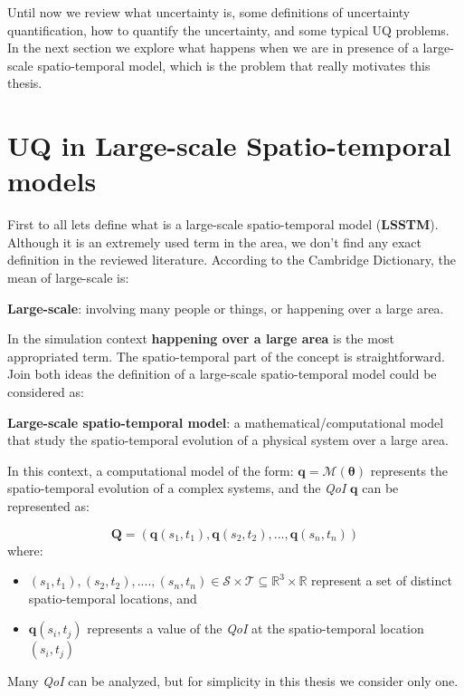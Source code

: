 Until now we review what uncertainty is, some definitions of uncertainty quantification, how to quantify the uncertainty, and some typical UQ problems. In the next section we explore what happens when we are in presence of a large-scale spatio-temporal model, which is the problem that really motivates this thesis.

\section{UQ in Large-scale Spatio-temporal models}\label{sec:uq_large_scale}
First to all lets define what is a large-scale spatio-temporal model (\textbf{LSSTM}). Although it is an extremely used term in the area, we don't find any exact definition in the reviewed literature. According to the Cambridge Dictionary, the mean of large-scale is:

\begin{defn}
\textbf{Large-scale}: involving many people or things, or happening over a large area.
\end{defn}

In the simulation context \textbf{happening over a large area} is the most appropriated term. The spatio-temporal part of the concept is straightforward. Join both ideas the definition of a large-scale spatio-temporal model could be considered as:

\begin{defn}
\textbf{Large-scale spatio-temporal model}: a mathematical/computational model that study the spatio-temporal evolution of a physical system over a large area.
\end{defn}

In this context, a computational model of the form: $\bm{q}=\mathcal{M}(\bm{\theta})$ represents the spatio-temporal evolution of a complex systems, and the \textit{QoI} $\bm{q}$ can be represented as:  

\begin{equation} \label{eq:spatio_temporal}
\mathbf{Q} = (\mathbf{q}(s_{1},t_{1}),\mathbf{q}(s_{2},t_{2}),...,\mathbf{q}(s_{n},t_{n}))  
\end{equation}
where:
\begin{itemize}
\item $(s_{1},t_{1}),(s_{2},t_{2}),....,(s_{n},t_{n}) \in \mathcal{S} \times \mathcal{T}\subseteq\mathbb{R}^{3}\times\mathbb{R}$ represent a set of distinct spatio-temporal locations, and
\item $\mathbf{q}(s_{i},t_{j})$ represents a value of the \textit{QoI} at the spatio-temporal location $(s_{i},t_{j})$
\end{itemize}
Many \textit{QoI} can be analyzed, but for simplicity in this thesis we consider only one.

